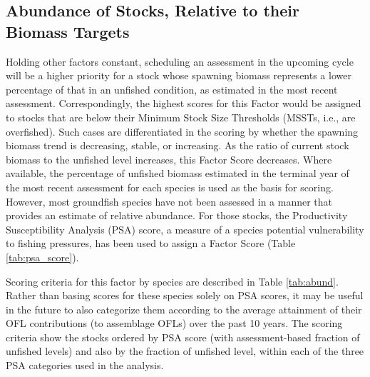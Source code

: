 \documentclass[12pt,]{article}
\begin{document}
\pagebreak

\subsection{Abundance of Stocks, Relative to their Biomass
Targets}\label{abundance-of-stocks-relative-to-their-biomass-targets}

Holding other factors constant, scheduling an assessment in the upcoming
cycle will be a higher priority for a stock whose spawning biomass
represents a lower percentage of that in an unfished condition, as
estimated in the most recent assessment. Correspondingly, the highest
scores for this Factor would be assigned to stocks that are below their
Minimum Stock Size Thresholds (MSSTs, i.e., are overfished). Such cases
are differentiated in the scoring by whether the spawning biomass trend
is decreasing, stable, or increasing. As the ratio of current stock
biomass to the unfished level increases, this Factor Score decreases.
Where available, the percentage of unfished biomass estimated in the
terminal year of the most recent assessment for each species is used as
the basis for scoring. However, most groundfish species have not been
assessed in a manner that provides an estimate of relative abundance.
For those stocks, the Productivity Susceptibility Analysis (PSA) score,
a measure of a species potential vulnerability to fishing pressures, has
been used to assign a Factor Score (Table \ref{tab:psa_score}).

Scoring criteria for this factor by species are described in Table
\ref{tab:abund}. Rather than basing scores for these species solely on
PSA scores, it may be useful in the future to also categorize them
according to the average attainment of their OFL contributions (to
assemblage OFLs) over the past 10 years. The scoring criteria show the
stocks ordered by PSA score (with assessment-based fraction of unfished
levels) and also by the fraction of unfished level, within each of the
three PSA categories used in the analysis.
\end{document}
